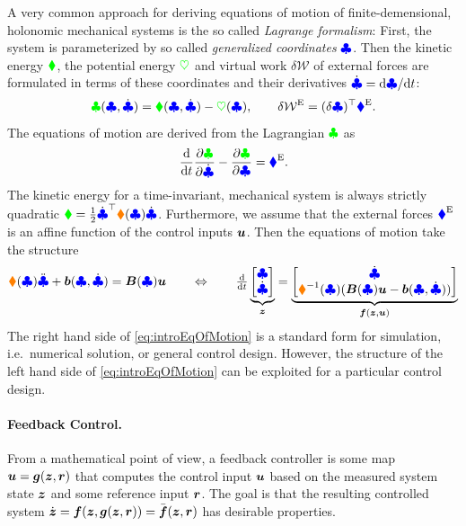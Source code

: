 A very common approach for deriving equations of motion of finite-demensional, holonomic mechanical systems is the so called \textit{Lagrange formalism}:
First, the system is parameterized by so called \textit{generalized coordinates} $\genCoord$.
Then the kinetic energy $\kineticEnergy$, the potential energy $\potentialEnergy$ and virtual work $\delta \mathcal{W}$ of external forces are formulated in terms of these coordinates and their derivatives $\genCoordd = \sfrac{\d \genCoord}{\d t}$:
\begin{align}
 \Lagrangian(\genCoord, \genCoordd) = \kineticEnergy(\genCoord, \genCoordd) - \potentialEnergy(\genCoord),
\qquad
 \delta\mathcal{W}^{\text{E}} = (\delta\genCoord)^\top \genForceEx.
\end{align}
The equations of motion are derived from the Lagrangian $\Lagrangian$ as
\begin{align}\label{eq:LagrangeEq}
 \diff{t} \pdiff[\Lagrangian]{\genCoordd} - \pdiff[\Lagrangian]{\genCoord} = \genForceEx.
\end{align}
The kinetic energy for a time-invariant, mechanical system is always strictly quadratic $\kineticEnergy = \tfrac{1}{2} \genCoordd^\top \sysInertiaMat(\genCoord)\genCoordd$.
Furthermore, we assume that the external forces $\genForceEx$ is an affine function of the control inputs $\sysInput$.
Then the equations of motion take the structure
\begin{align}\label{eq:introEqOfMotion}
 \sysInertiaMat(\genCoord)\genCoorddd + \sysForce(\genCoord,\genCoordd) = \sysInputMat(\genCoord) \sysInput
\qquad \Leftrightarrow \qquad
 \tdiff{t} \underbrace{\begin{bmatrix} \genCoord \\ \genCoordd \end{bmatrix}}_{\sysState}
 = \underbrace{\begin{bmatrix} \genCoordd \\ \sysInertiaMat^{-1}(\genCoord)(\sysInputMat(\genCoord) \sysInput - \sysForce(\genCoord,\genCoordd)) \end{bmatrix}}_{\tuple{f}(\sysState,\sysInput)}
\end{align}
The right hand side of \eqref{eq:introEqOfMotion} is a standard form for simulation, i.e.\ numerical solution, or general control design.
However, the structure of the left hand side of \eqref{eq:introEqOfMotion} can be exploited for a particular control design.

\paragraph{Feedback Control.}
From a mathematical point of view, a feedback controller is some map $\sysInput = \tuple{g}(\sysState,\tuple{r})$ that computes the control input $\sysInput$ based on the measured system state $\sysState$ and some reference input $\tuple{r}$.
The goal is that the resulting controlled system $\dot{\sysState} = \tuple{f}(\sysState,\tuple{g}(\sysState,\tuple{r})) = \bar{\tuple{f}}(\sysState,\tuple{r})$ has desirable properties.

